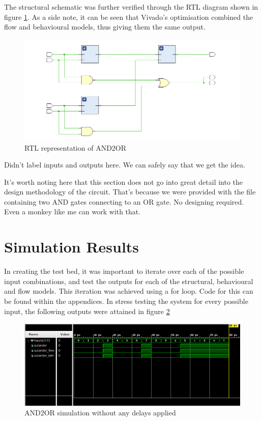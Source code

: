 \documentclass[12pt,a4paper]{article}
\begin{document}
The structural schematic was further verified through the RTL diagram shown in figure \ref{fig:rtl}. As a side note, it can be seen that Vivado's optimisation combined the flow and behavioural models, thus giving them the same output.

\begin{figure}[H]
    \centering
    \includegraphics[scale=0.5]{images/rtl.png}
    \caption{RTL representation of AND2OR}
    \label{fig:rtl}
\end{figure}

Didn't label inputs and outputs here. We can safely say that we get the idea.

It's worth noting here that this section does not go into great detail into the design methodology of the circuit. That's because we were provided with the file containing two AND gates connecting to an OR gate. No designing required. Even a monkey like me can work with that.

\section{Simulation Results}

In creating the test bed, it was important to iterate over each of the possible input combinations, and test the outputs for each of the structural, behavioural and flow models. This iteration was achieved using a for loop. Code for this can be found within the appendices. In stress testing the system for every possible input, the following outputs were attained in figure \ref{fig:simulation_no_delay}

\begin{figure}[H]
    \centering
    \includegraphics[scale=0.25]{images/simulation_no_delay.png}
    \caption{AND2OR simulation without any delays applied}
    \label{fig:simulation_no_delay}
\end{figure}
\end{document}
